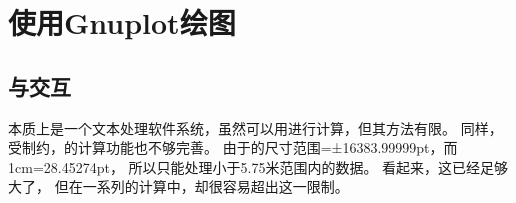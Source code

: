 \documentclass[../main.tex]{subfiles}
\begin{document}
\section{使用Gnuplot绘图}
\subsection{\TIKZ{}与交互}

\TEX{}本质上是一个文本处理软件系统，虽然可以用\TEX{}进行计算，但其方法有限。
同样，受\TEX{}制约，\TIKZ{}的计算功能也不够完善。
由于\TEX{}的尺寸范围=±16383.99999pt，而1cm=28.45274pt，
所以\TEX{}只能处理小于5.75米范围内的数据。
看起来，这已经足够大了，
但在一系列的计算中，却很容易超出这一限制。
\end{document}
